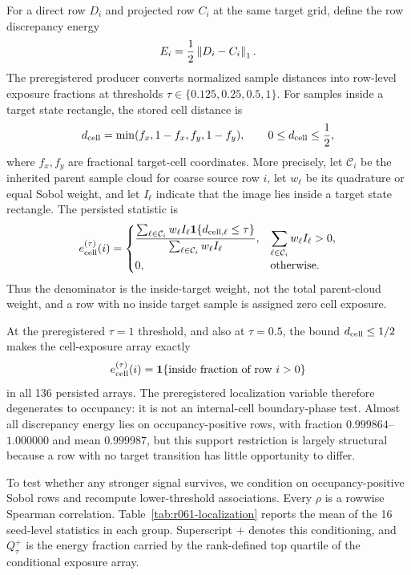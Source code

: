 For a direct row $D_i$ and projected row $C_i$ at the same target grid, define
the row discrepancy energy
\begin{equation}
 E_i=\frac12\left\lVert D_i-C_i\right\rVert_1.
 \label{eq:row-energy}
\end{equation}
The preregistered producer converts normalized sample distances into row-level
exposure fractions at thresholds
$\tau\in\{0.125,0.25,0.5,1\}$.  For samples inside a target state rectangle,
the stored cell distance is
\begin{equation}
 d_{\rm cell}=\min(f_x,1-f_x,f_y,1-f_y),
 \qquad 0\leq d_{\rm cell}\leq\frac12,
 \label{eq:cell-distance}
\end{equation}
where $f_x,f_y$ are fractional target-cell coordinates.  More precisely, let
$\mathcal C_i$ be the inherited parent sample cloud for coarse source row $i$,
let $w_\ell$ be its quadrature or equal Sobol weight, and let $I_\ell$ indicate
that the image lies inside a target state rectangle.  The persisted statistic
is
\begin{equation}
 e^{(\tau)}_{\rm cell}(i)=
 \begin{cases}
 \displaystyle
 \frac{\sum_{\ell\in\mathcal C_i}w_\ell I_\ell
       \mathbf 1\{d_{{\rm cell},\ell}\leq\tau\}}
      {\sum_{\ell\in\mathcal C_i}w_\ell I_\ell},
 & \displaystyle\sum_{\ell\in\mathcal C_i}w_\ell I_\ell>0,\\[2ex]
 0, & \text{otherwise}.
 \end{cases}
 \label{eq:cell-exposure}
\end{equation}
Thus the denominator is the inside-target weight, not the total parent-cloud
weight, and a row with no inside target sample is assigned zero cell exposure.

At the preregistered $\tau=1$ threshold, and also at $\tau=0.5$, the
bound $d_{\rm cell}\leq1/2$ makes the cell-exposure array exactly
\begin{equation}
 e^{(\tau)}_{\rm cell}(i)
 =\mathbf 1\{\text{inside fraction of row }i>0\}
 \label{eq:occupancy-indicator}
\end{equation}
in all 136 persisted arrays.  The preregistered localization variable therefore
degenerates to occupancy: it is not an internal-cell boundary-phase test.
Almost all discrepancy energy lies on occupancy-positive rows, with fraction
$0.999864$--$1.000000$ and mean $0.999987$, but this support restriction is
largely structural because a row with no target transition has little
opportunity to differ.

To test whether any stronger signal survives, we condition on
occupancy-positive Sobol rows and recompute lower-threshold associations.
Every $\rho$ is a rowwise Spearman correlation.  Table~\ref{tab:r061-localization}
reports the mean of the 16 seed-level statistics in each group.  Superscript
$+$ denotes this conditioning, and
$Q^+_{\tau}$ is the energy fraction carried by the rank-defined top quartile of
the conditional exposure array.

